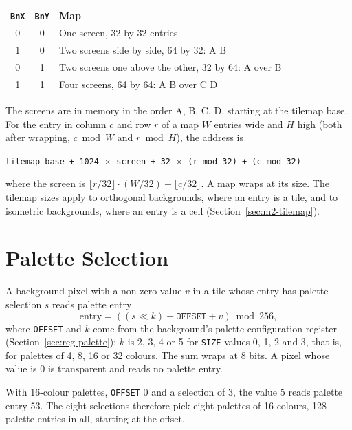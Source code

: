 \begin{center}
	\begin{tabular}{ccl}
		\toprule
		\texttt{BnX} & \texttt{BnY} & Map                                                 \\
		\midrule
		0            & 0            & One screen, 32 by 32 entries                        \\
		1            & 0            & Two screens side by side, 64 by 32: A B             \\
		0            & 1            & Two screens one above the other, 32 by 64: A over B \\
		1            & 1            & Four screens, 64 by 64: A B over C D                \\
		\bottomrule
	\end{tabular}
\end{center}

The screens are in memory in the order A, B, C, D, starting at the tilemap base. For the entry in column $c$ and row
$r$ of a map $W$ entries wide and $H$ high (both after wrapping, $c \bmod W$ and $r \bmod H$), the address is

\begin{center}
	\texttt{tilemap base + 1024 $\times$ screen + 32 $\times$ (r mod 32) + (c mod 32)}
\end{center}

where the screen is $\lfloor r/32 \rfloor \cdot (W/32) + \lfloor c/32 \rfloor$. A map wraps at its size. The tilemap
sizes apply to orthogonal backgrounds, where an entry is a tile, and to isometric backgrounds, where an entry is a cell
(Section~\ref{sec:m2-tilemap}).

\section{Palette Selection}
\label{sec:palette-select}

A background pixel with a non-zero value $v$ in a tile whose entry has palette selection $s$ reads palette entry
\[
	\text{entry} = ((s \ll k) + \texttt{OFFSET} + v) \bmod 256,
\]
where \texttt{OFFSET} and $k$ come from the background's palette configuration register
(Section~\ref{sec:reg-palette}): $k$ is 2, 3, 4 or 5 for \texttt{SIZE} values 0, 1, 2 and 3, that is, for palettes of
4, 8, 16 or 32 colours. The sum wraps at 8 bits. A pixel whose value is 0 is transparent and reads no palette entry.

With 16-colour palettes, \texttt{OFFSET} 0 and a selection of 3, the value 5 reads palette entry 53. The eight
selections therefore pick eight palettes of 16 colours, 128 palette entries in all, starting at the offset.

